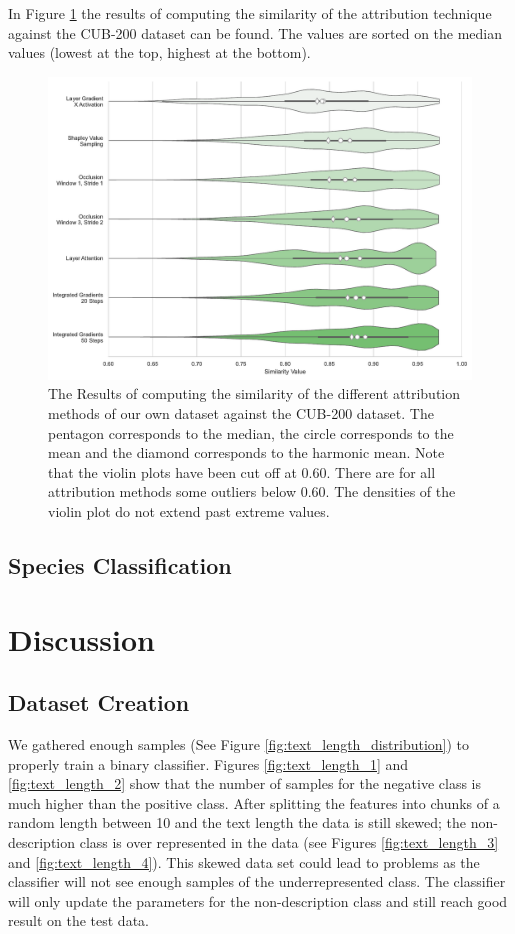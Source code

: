 \documentclass[a4paper, 12pt, oneside]{book} %
\begin{document}
In Figure \ref{fig:hmean_violin} the results of computing the similarity of the attribution technique against the CUB-200 dataset can be found.
The values are sorted on the median values (lowest at the top, highest at the bottom).


\begin{figure}[h!]
 \centering
 \includegraphics[width=\textwidth]{figures/hmean_violinplot.pdf}
 \caption[Similarity results]{The Results of computing the similarity of the different attribution methods of our own dataset against the CUB-200 dataset. The pentagon corresponds to the median, the circle corresponds to the mean and the diamond corresponds to the harmonic mean. Note that the violin plots have been cut off at 0.60. There are for all attribution methods some outliers below 0.60. The densities of the violin plot do not extend past extreme values.}
 \label{fig:hmean_violin}
\end{figure}

\subsection{Species Classification}
\newpage
\section{Discussion} \label{par:discussion}

\subsection{Dataset Creation}
We gathered enough samples (See Figure \ref{fig:text_length_distribution}) to properly train a binary classifier.
Figures \ref{fig:text_length_1} and \ref{fig:text_length_2} show that the number of samples for the negative class is much higher than the positive class. 
After splitting the features into chunks of a random length between 10 and the text length the data is still skewed; the non-description class is over represented in the data (see Figures \ref{fig:text_length_3} and \ref{fig:text_length_4}). 
This skewed data set could lead to problems as the classifier will not see enough samples of the underrepresented class. 
The classifier will only update the parameters for the non-description class and still reach good result on the test data.
\end{document}
